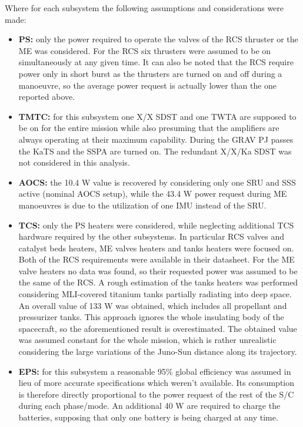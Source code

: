 Where for each subsystem the following assumptions and considerations were made:
\begin{itemize}
    \item \textbf{PS:} only the power required to operate the valves of the RCS thruster or the ME was considered. For the RCS six thrusters were assumed to be on simultaneously at any given time. It can also be noted that the RCS require power only in short burst as the thrusters are turned on and off during a manoeuvre, so the average power request is actually lower than the one reported above.
    \item \textbf{TMTC:} for this subsystem one X/X SDST and one TWTA are supposed to be on for the entire mission while also presuming that the amplifiers are always operating at their maximum capability. During the GRAV PJ passes the KaTS and the SSPA are turned on. The redundant X/X/Ka SDST was not considered in this analysis.
    \item \textbf{AOCS:} the 10.4 W value is recovered by considering only one SRU and SSS active (nominal AOCS setup), while the 43.4 W power request during ME manoeuvres is due to the utilization of one IMU instead of the SRU.
    \item \textbf{TCS:} only the PS heaters were considered, while neglecting additional TCS hardware required by the other subsystems. In particular RCS valves and catalyst beds heaters, ME valves heaters and tanks heaters were focused on. Both of the RCS requirements were available in their datasheet. \cite{RCS_values}
    For the ME valve heaters no data was found, so their requested power was assumed to be the same of the RCS. A rough estimation of the tanks heaters was performed considering MLI-covered titanium tanks partially radiating into deep space. An overall value of 133 W was obtained, which includes all propellant and pressurizer tanks. This approach ignores the whole insulating body of the spacecraft, so the aforementioned result is overestimated. The obtained value was assumed constant for the whole mission, which is rather unrealistic considering the large variations of the Juno-Sun distance along its trajectory.  
    \item \textbf{EPS:} for this subsystem a reasonable 95\% global efficiency was assumed in lieu of more accurate specifications which weren't available. Its consumption is therefore directly proportional to the power request of the rest of the S/C during each phase/mode. An additional 40 W are required to charge the batteries, \cite{batteries_info} supposing that only one battery is being charged at any time.     

\end{itemize}
